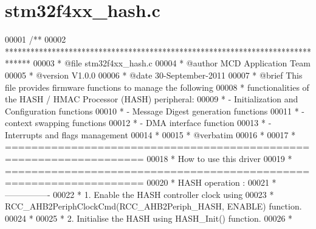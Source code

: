 \section{stm32f4xx\+\_\+hash.\+c}
\label{stm32f4xx__hash_8c_source}

\begin{DoxyCode}
00001 \textcolor{comment}{/**}
00002 \textcolor{comment}{  ******************************************************************************}
00003 \textcolor{comment}{  * @file    stm32f4xx\_hash.c}
00004 \textcolor{comment}{  * @author  MCD Application Team}
00005 \textcolor{comment}{  * @version V1.0.0}
00006 \textcolor{comment}{  * @date    30-September-2011}
00007 \textcolor{comment}{  * @brief   This file provides firmware functions to manage the following }
00008 \textcolor{comment}{  *          functionalities of the HASH / HMAC Processor (HASH) peripheral:           }
00009 \textcolor{comment}{  *           - Initialization and Configuration functions}
00010 \textcolor{comment}{  *           - Message Digest generation functions}
00011 \textcolor{comment}{  *           - context swapping functions   }
00012 \textcolor{comment}{  *           - DMA interface function       }
00013 \textcolor{comment}{  *           - Interrupts and flags management       }
00014 \textcolor{comment}{  *         }
00015 \textcolor{comment}{  *  @verbatim}
00016 \textcolor{comment}{  *                               }
00017 \textcolor{comment}{  *          ===================================================================      }
00018 \textcolor{comment}{  *                                   How to use this driver}
00019 \textcolor{comment}{  *          ===================================================================}
00020 \textcolor{comment}{  *          HASH operation : }
00021 \textcolor{comment}{  *          ----------------                   }
00022 \textcolor{comment}{  *         1. Enable the HASH controller clock using }
00023 \textcolor{comment}{  *            RCC\_AHB2PeriphClockCmd(RCC\_AHB2Periph\_HASH, ENABLE) function.}
00024 \textcolor{comment}{  *           }
00025 \textcolor{comment}{  *         2. Initialise the HASH using HASH\_Init() function. }
00026 \textcolor{comment}{  *               }

\end{DoxyCode}
